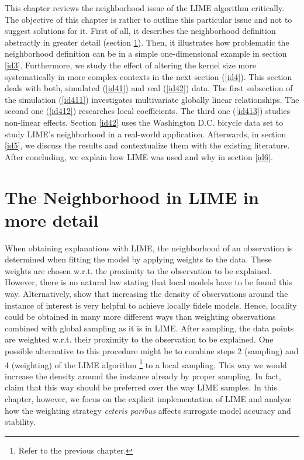 \documentclass[]{krantz}
\begin{document}
This chapter reviews the neighborhood issue of the LIME algorithm
critically. The objective of this chapter is rather to outline this
particular issue and not to suggest solutions for it. First of all, it
describes the neighborhood definition abstractly in greater detail
(section \ref{id2}). Then, it illustrates how problematic the
neighborhood definition can be in a simple one-dimensional example in
section \ref{id3}. Furthermore, we study the effect of altering the
kernel size more systematically in more complex contexts in the next
section (\ref{id4}). This section deals with both, simulated
(\ref{id41}) and real (\ref{id42}) data. The first subsection of the
simulation (\ref{id411}) investigates multivariate globally linear
relationships. The second one (\ref{id412}) researches local
coefficients. The third one (\ref{id413}) studies non-linear effects.
Section \ref{id42} uses the Washington D.C. bicycle data set to study
LIME's neighborhood in a real-world application. Afterwards, in section
\ref{id5}, we discuss the results and contextualize them with the
existing literature. After concluding, we explain how LIME was used and
why in section \ref{id6}.

\section{The Neighborhood in LIME in more detail}\label{id2}

When obtaining explanations with LIME, the neighborhood of an
observation is determined when fitting the model by applying weights to
the data. These weights are chosen w.r.t. the proximity to the
observation to be explained. However, there is no natural law stating
that local models have to be found this way. Alternatively,
\citet{craven1996} show that increasing the density of observations
around the instance of interest is very helpful to achieve locally
fidele models. Hence, locality could be obtained in many more different
ways than weighting observations combined with global sampling as it is
in LIME. After sampling, the data points are weighted w.r.t. their
proximity to the observation to be explained. One possible alternative
to this procedure might be to combine steps 2 (sampling) and 4
(weighting) of the LIME algorithm \footnote{Refer to the previous
  chapter.} to a local sampling. This way we would increase the density
around the instance already by proper sampling. In fact,
\citet{laugel2018defining} claim that this way should be preferred over
the way LIME samples. In this chapter, however, we focus on the explicit
implementation of LIME and analyze how the weighting strategy
\emph{ceteris paribus} affects surrogate model accuracy and stability.
\end{document}
